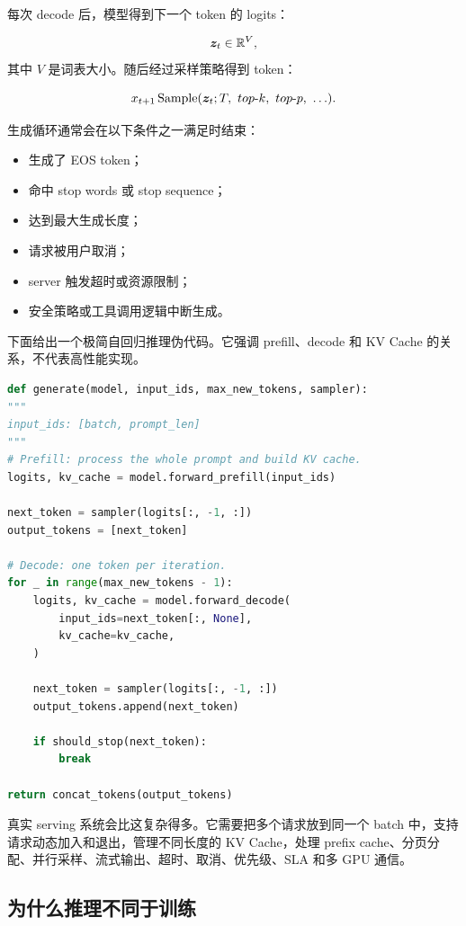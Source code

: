 每次 decode 后，模型得到下一个 token 的 logits：

\[
\bm{z}_t\in\mathbb{R}^{V},
\]
其中 $V$ 是词表大小。随后经过采样策略得到 token：

\[
x_{t+1}
\operatorname{Sample}
(
\bm{z}_t;
T,\ top\text{-}k,\ top\text{-}p,\ \ldots
).
\]

生成循环通常会在以下条件之一满足时结束：

\begin{itemize}
\item 生成了 EOS token；
\item 命中 stop words 或 stop sequence；
\item 达到最大生成长度；
\item 请求被用户取消；
\item server 触发超时或资源限制；
\item 安全策略或工具调用逻辑中断生成。
\end{itemize}

下面给出一个极简自回归推理伪代码。它强调 prefill、decode 和 KV Cache 的关系，不代表高性能实现。

\begin{lstlisting}[language=Python,caption={自回归推理中 prefill、decode 与 KV Cache 的极简伪代码},label={lst:autoregressive-generation-kv-cache}]
def generate(model, input_ids, max_new_tokens, sampler):
"""
input_ids: [batch, prompt_len]
"""
# Prefill: process the whole prompt and build KV cache.
logits, kv_cache = model.forward_prefill(input_ids)

next_token = sampler(logits[:, -1, :])
output_tokens = [next_token]

# Decode: one token per iteration.
for _ in range(max_new_tokens - 1):
    logits, kv_cache = model.forward_decode(
        input_ids=next_token[:, None],
        kv_cache=kv_cache,
    )

    next_token = sampler(logits[:, -1, :])
    output_tokens.append(next_token)

    if should_stop(next_token):
        break

return concat_tokens(output_tokens)

\end{lstlisting}

真实 serving 系统会比这复杂得多。它需要把多个请求放到同一个 batch 中，支持请求动态加入和退出，管理不同长度的 KV Cache，处理 prefix cache、分页分配、并行采样、流式输出、超时、取消、优先级、SLA 和多 GPU 通信。

\subsection{为什么推理不同于训练}
\label{subsec:why-inference-differs-from-training}

